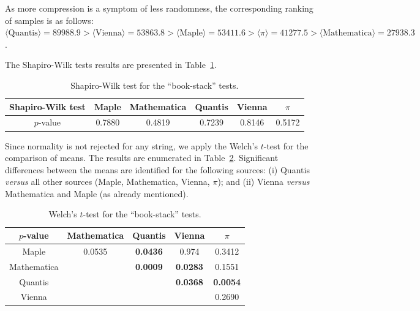 \documentclass[%
 preprint,
 showpacs,
 showkeys,
 preprintnumbers,
 amsmath,amssymb,
 aps,
 prl,
  longbibliography,
 ]{revtex4-1}
\begin{document}
As more compression is a symptom of less randomness,  the corresponding ranking of
samples is as follows:
$\langle \text{Quantis} \rangle  = 89988.9 > \langle \text{Vienna} \rangle  = 53863.8  >  \langle \text{Maple} \rangle  =
53411.6 > \langle  \pi \rangle  = 41277.5  >  \langle \text{Mathematica} \rangle  = 27938.3$.


The Shapiro-Wilk tests results are presented in  Table~\ref{tab:9}.

\begin{table}
\caption{Shapiro-Wilk test for the ``book-stack'' tests.}\label{tab:9}
\begin{center}
\begin{tabular}
[c]{ c c c c c c }\hline\hline
Shapiro-Wilk test & Maple & Mathematica & Quantis & Vienna  & $\pi$\\\hline
$p$-value  & 0.7880 & 0.4819 & 0.7239 & 0.8146 &
0.5172\\\hline\hline
\end{tabular}
\end{center}
\end{table}

Since normality is not rejected for any string, we apply the Welch's $t$-test
for the comparison of means. The results are enumerated in Table~\ref{tab:10}.
Significant differences between the means are identified for the following sources:
(i) Quantis {\it versus} all other sources (Maple, Mathematica, Vienna, $\pi$); and
(ii)
Vienna {\it versus} Mathematica and Maple (as already mentioned).



\begin{table}
\caption{Welch's $t$-test for the ``book-stack'' tests.}\label{tab:10}
\begin{center}
\begin{tabular}
[c]{ c c c c c }\hline\hline
$p$-value & Mathematica & Quantis & Vienna & $\pi$\\\hline
Maple  & 0.0535 & \bf{0.0436} & 0.974 & 0.3412\\
Mathematica &  & \bf{0.0009} & \bf{0.0283} & 0.1551\\
Quantis  &  &  & \bf{0.0368} & \bf{0.0054}\\
Vienna &  &  &  & 0.2690\\\hline\hline
\end{tabular}
\end{center}
\end{table}
\end{document}
